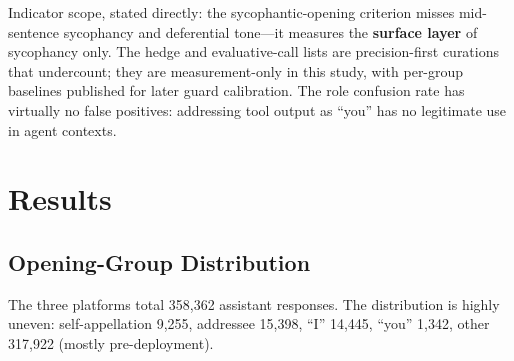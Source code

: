 \documentclass[10pt,twocolumn]{article}
\begin{document}
Indicator scope, stated directly: the sycophantic-opening criterion misses mid-sentence
sycophancy and deferential tone---it measures the \textbf{surface layer} of sycophancy
only. The hedge and evaluative-call lists are precision-first curations that undercount;
they are measurement-only in this study, with per-group baselines published for later
guard calibration. The role confusion rate has virtually no false positives: addressing
tool output as ``you'' has no legitimate use in agent contexts.

\section{Results}
\subsection{Opening-Group Distribution}
The three platforms total 358{,}362 assistant responses. The distribution is highly
uneven: self-appellation 9{,}255, addressee 15{,}398, ``I'' 14{,}445, ``you'' 1{,}342,
other 317{,}922 (mostly pre-deployment).
\end{document}
